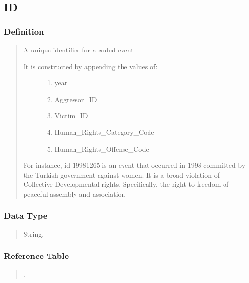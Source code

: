 \documentclass[letterpaper,10pt,english]{sphinxmanual}
\begin{document}
\subsection{ID}
\label{\detokenize{schema_tables:id}}

\subsubsection{Definition}
\label{\detokenize{schema_tables:id88}}\begin{quote}

\sphinxAtStartPar
A unique identifier for a coded event
\begin{description}
\item[{It is constructed by appending the values of:}] \leavevmode\begin{enumerate}
%
\item {} 
\sphinxAtStartPar
year

\item {} 
\sphinxAtStartPar
Aggressor\_ID

\item {} 
\sphinxAtStartPar
Victim\_ID

\item {} 
\sphinxAtStartPar
Human\_Rights\_Category\_Code

\item {} 
\sphinxAtStartPar
Human\_Rights\_Offense\_Code

\end{enumerate}

\end{description}

\sphinxAtStartPar
For instance, id 19981265 is an event that occurred in 1998 committed by the Turkish government against women.  It is a broad violation of Collective Developmental rights.  Specifically, the right to freedom of peaceful assembly and association
\end{quote}


\subsubsection{Data Type}
\label{\detokenize{schema_tables:id89}}\begin{quote}

\sphinxAtStartPar
String.
\end{quote}


\subsubsection{Reference Table}
\label{\detokenize{schema_tables:id90}}\begin{quote}

\sphinxAtStartPar
{\hyperref[\detokenize{schema_tables:overview-table}]{}}.
\end{quote}
\end{document}
